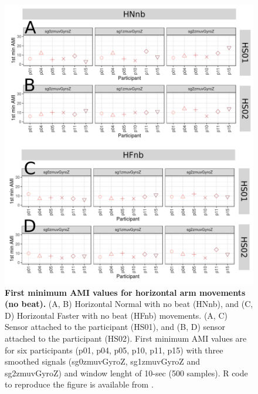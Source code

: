 \begin{figure}[!h]
\centering
\includegraphics[width=1.0\textwidth]{ami_Hnb_w10}
	\caption{
	{\bf First minimum AMI values for horizontal arm movements (no beat).}
		(A, B) Horizontal Normal with no beat (HNnb), and 
		(C, D) Horizontal Faster with no beat (HFnb) movements.
		(A, C) Sensor attached to the participant (HS01), and
		(B, D) sensor attached to the participant (HS02).
		First minimum AMI values are for six participants 
		(p01, p04, p05, p10, p11, p15) with three smoothed 
		signals (sg0zmuvGyroZ, sg1zmuvGyroZ and sg2zmuvGyroZ) and 
		window lenght of 10-sec (500 samples).
		R code to reproduce the figure is available 
		from \cite{hwum2018}.
        }
    \label{fig:amiHnb}
\end{figure}
